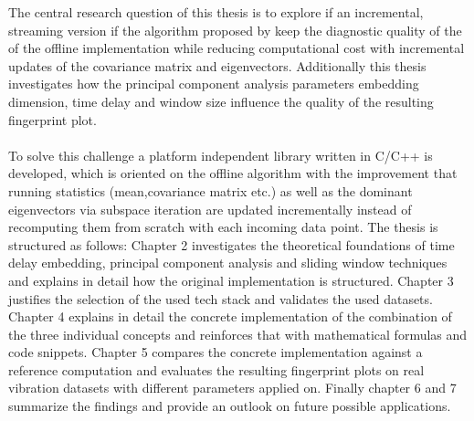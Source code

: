 The central research question of this thesis is to explore if an incremental, streaming version if the algorithm proposed by \textcite{rakuschek2025visual} keep the diagnostic quality of the of the offline implementation while reducing computational cost with incremental updates of the covariance matrix and eigenvectors. Additionally this thesis investigates how the principal component analysis parameters embedding dimension, time delay and window size influence the quality of the resulting fingerprint plot. \\ \\
To solve this challenge a platform independent library written in C/C++ is developed, which is oriented on the offline algorithm with the improvement that running statistics (mean,covariance matrix etc.) as well as the dominant eigenvectors via subspace iteration are updated incrementally instead of recomputing them from scratch with each incoming data point. The thesis is structured as follows: Chapter 2 investigates the theoretical foundations of time delay embedding, principal component analysis and sliding window techniques and explains in detail how the original implementation is structured. Chapter 3 justifies the selection of the used tech stack and validates the used datasets. Chapter 4 explains in detail the concrete implementation of the combination of the three individual concepts and reinforces that with mathematical formulas and code snippets. Chapter 5 compares the concrete implementation against a reference computation and evaluates the resulting fingerprint plots on real vibration datasets with different parameters applied on. Finally chapter 6 and 7 summarize the findings and provide an outlook on future possible applications.